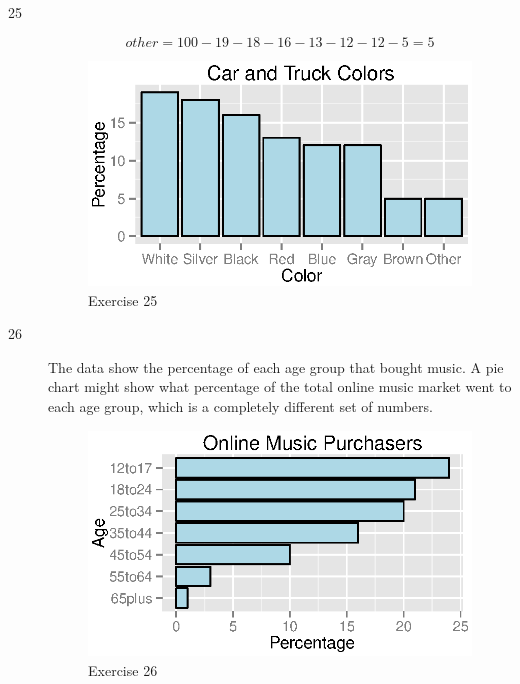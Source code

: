 \documentclass{exam}
\begin{document}
\begin{description}

      \item[25]
          \[
            other = 100 - 19 - 18 - 16 - 13 - 12 - 12 - 5 = 5
          \]

          \begin{figure}[H]
            \centering
            \includegraphics{figures/ex25.eps}
            \caption{Exercise 25}
          \end{figure}

      \item[26]
        The data show the percentage of each age group that bought music.  A pie chart might show what percentage of
        the total online music market went to each age group, which is a completely different set of numbers.

        \begin{figure}[H]
          \centering
          \includegraphics{figures/ex26.eps}
          \caption{Exercise 26}
        \end{figure}


\end{description}
\end{document}
